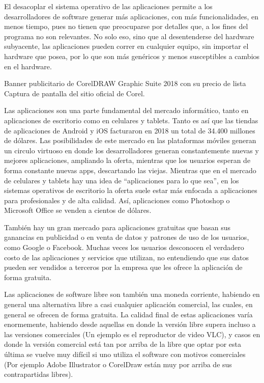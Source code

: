 El desacoplar el sistema operativo de las aplicaciones permite a los desarrolladores
de software generar más aplicaciones, con más funcionalidades, en menos tiempo,
pues no tienen que preocuparse por detalles que, a los fines del programa no son
relevantes. No solo eso, sino que al desentenderse del hardware subyacente, las
aplicaciones pueden correr en cualquier equipo, sin importar el hardware que posea,
por lo que son más genéricos y menos susceptibles a cambios en el hardware.

{Banner publicitario de CorelDRAW Graphic Suite 2018 con su precio de lista}
{Captura de pantalla del sitio oficial de Corel.}

Las aplicaciones son una parte fundamental del mercado informático, tanto en
aplicaciones de escritorio como en celulares y tablets. Tanto es así que las
tiendas de aplicaciones de Android y iOS facturaron en 2018 un total de
34.400 millones de dólares. Las posibilidades de este mercado en las plataformas
móviles generan un circulo virtuoso en donde los desarrolladores generan
constantemente nuevas y mejores aplicaciones, ampliando la oferta, mientras que
los usuarios esperan de forma constante nuevas apps, descartando las viejas.
Mientras que en el mercado de celulares y tablets hay una idea de ``aplicaciones
para lo que sea'', en los sistemas operativos de escritorio la oferta suele estar
más enfocada a aplicaciones para profesionales y de alta calidad. Así, aplicaciones
como Photoshop o Microsoft Office se venden a cientos de dólares.

También hay un gran mercado para aplicaciones gratuitas que basan sus ganancias
en publicidad o en venta de datos y patrones de uso de los usuarios, como
Google o Facebook. Muchas veces los usuarios desconocen el verdadero costo de
las aplicaciones y servicios que utilizan, no entendiendo que sus datos pueden
ser vendidos a terceros por la empresa que les ofrece la aplicación de forma
gratuita.

Las aplicaciones de software libre son también una moneda corriente, habiendo
en general una alternativa libre a casi cualquier aplicación comercial, las
cuales, en general se ofrecen de forma gratuita. La calidad final de estas
aplicaciones varía enormemente, habiendo desde aquellas en donde la versión
libre supera incluso a las versiones comerciales (Un ejemplo es el reproductor
de video VLC), y casos en donde la versión comercial está tan por arriba de la
libre que optar por esta última se vuelve muy difícil si uno utiliza el software
con motivos comerciales (Por ejemplo Adobe Illustrator o CorelDraw están muy por arriba
de sus contrapartidas libres).

